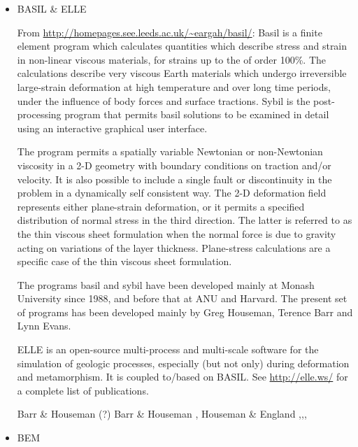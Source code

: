 \begin{itemize}
\item {\codefont BASIL \& ELLE} 

From \url{http://homepages.see.leeds.ac.uk/~eargah/basil/}:
Basil is a finite element program which calculates quantities which describe  stress  and strain in non-linear viscous materials, for strains up to the of order 100\%.   
The calculations  describe  very  viscous  Earth materials which undergo irreversible large-strain 
deformation at  high  temperature  and over long time periods, under the influence of body 
forces and surface tractions.  Sybil  is the post-processing program that permits basil 
solutions to be examined in detail using an interactive graphical user interface.

The program permits a spatially variable Newtonian  or  non-Newtonian  viscosity  in a 2-D 
geometry with boundary conditions on traction and/or velocity.  It is also  possible  
to include  a single fault or discontinuity in the problem in a dynamically self consistent way.  
The 2-D deformation  field represents  either plane-strain deformation, or it permits 
a specified distribution of normal stress in the third  direction.   The  latter is referred 
to as the thin viscous sheet formulation when the normal force is due to  gravity  acting on 
variations of the layer thickness.  Plane-stress calculations are a specific case of 
the thin viscous sheet formulation.

The programs basil and sybil have been developed  mainly  at Monash  University  since  1988,  
and before that at ANU and Harvard.  The present set of  programs  has  been  developed mainly  by  
Greg  Houseman, Terence  Barr  and  Lynn Evans.

ELLE is an open-source multi-process and multi-scale software for the simulation of geologic processes, especially (but not only) during deformation and metamorphism. It is coupled to/based on BASIL. See \url{http://elle.ws/} for a complete list of publications.

\begin{scriptsize}
Barr \& Houseman \cite{baho92}(?)
Barr \& Houseman \cite{baho96}, Houseman \& England \cite{hoen96}
\cite{hogu97},\cite{homo97},\cite{bobt97},\cite{neho97}
\cite{honk00}
\cite{tesb01}
\cite{bokj08}
\cite{llor19}
\end{scriptsize}

\item {\codefont BEM} 


\end{itemize}
